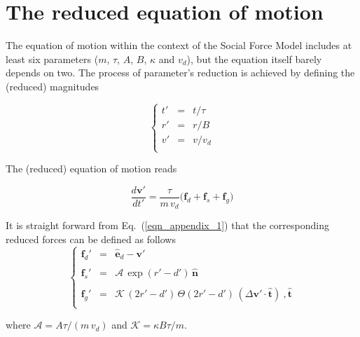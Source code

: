 \appendix

\section{\label{appendix_1}The reduced equation of motion}

The equation of motion within the context of the Social 
Force Model includes at least six parameters ($m$, $\tau$, $A$, $B$, 
$\kappa$ and $v_d$), but the equation itself barely depends on two. The process 
of parameter's reduction is achieved by defining the (reduced) magnitudes 

\begin{equation}
 \left\{\begin{array}{lll}
         t' & = & t/\tau \\
         r' & =& r/B \\
         v' & = & v/v_d \\
        \end{array}\right.
\end{equation}

The (reduced) equation of motion reads 


\begin{equation}
\displaystyle\frac{d\mathbf{v}'}{dt'}=
\displaystyle\frac{\tau}{m\,v_d}\bigg(\mathbf{f}_d+
\mathbf{f}_s+\mathbf{f}_g\bigg)\label{eqn_appendix_1}
\end{equation}

It is straight forward from Eq.~(\ref{eqn_appendix_1}) that the 
corresponding reduced forces can 
be defined as follows\\

\begin{equation}
 \left\{\begin{array}{lll}
         \mathbf{f}_d' & = & \hat{\mathbf{e}}_d-\mathbf{v}' \\
         && \\
         \mathbf{f}_s' & =& \mathcal{A}\,\exp(r'-d')\,\hat{\mathbf{n}} \\
         && \\
         \mathbf{f}_g' & = & 
\mathcal{K}\,(2r'-d')\,\Theta(2r'-d')\,(\Delta\mathbf{v}'\cdot\hat{\mathbf{t}})\
, 
\hat{\mathbf{t}} \\
        \end{array}\right.\label{eqn_appendix_2}
\end{equation}


\noindent where $\mathcal{A}=A\tau/(m\,v_d)$ and 
$\mathcal{K}=\kappa B\tau/m$. \\ 

